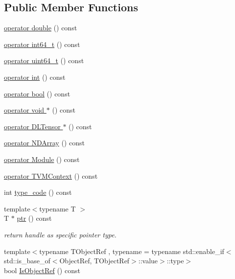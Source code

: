 \subsection*{Public Member Functions}
\begin{DoxyCompactItemize}
\item 
\hyperlink{classtvm_1_1runtime_1_1TVMPODValue___a5ce868719163d4131526a51ae50ee58d}{operator double} () const 
\item 
\hyperlink{classtvm_1_1runtime_1_1TVMPODValue___ac165086c9b9eb10ec15843681beedb3b}{operator int64\+\_\+t} () const 
\item 
\hyperlink{classtvm_1_1runtime_1_1TVMPODValue___abee98b24b41c9cfd0731ba5c5f5846a3}{operator uint64\+\_\+t} () const 
\item 
\hyperlink{classtvm_1_1runtime_1_1TVMPODValue___a50fddd03f30c0feb612cdb9eb2e2ad70}{operator int} () const 
\item 
\hyperlink{classtvm_1_1runtime_1_1TVMPODValue___a6d3e2520d7329a8ef0d4ada22ece5fa8}{operator bool} () const 
\item 
\hyperlink{classtvm_1_1runtime_1_1TVMPODValue___a2b823e57fb67bba8c052d7c2f8892253}{operator void $\ast$} () const 
\item 
\hyperlink{classtvm_1_1runtime_1_1TVMPODValue___ad4ac7900cf899e31f5834c8ac3a2d6d1}{operator D\+L\+Tensor $\ast$} () const 
\item 
\hyperlink{classtvm_1_1runtime_1_1TVMPODValue___a2b949a0699c7d58ea7cd8eda6c3e1bcf}{operator N\+D\+Array} () const 
\item 
\hyperlink{classtvm_1_1runtime_1_1TVMPODValue___a6a2d985b2e4573dcb2f518299c08b365}{operator Module} () const 
\item 
\hyperlink{classtvm_1_1runtime_1_1TVMPODValue___a4fc0e1332d57c439e8bf8c05aff15fbc}{operator T\+V\+M\+Context} () const 
\item 
int \hyperlink{classtvm_1_1runtime_1_1TVMPODValue___a5a799e4197f227549cd641b0e753f9b8}{type\+\_\+code} () const 
\item 
{\footnotesize template$<$typename T $>$ }\\T $\ast$ \hyperlink{classtvm_1_1runtime_1_1TVMPODValue___a362662e4d4b67c031ff70d4397052b29}{ptr} () const 
\begin{DoxyCompactList}\small\item\em return handle as specific pointer type. \end{DoxyCompactList}\item 
{\footnotesize template$<$typename T\+Object\+Ref , typename  = typename std\+::enable\+\_\+if$<$             std\+::is\+\_\+base\+\_\+of$<$\+Object\+Ref, T\+Object\+Ref$>$\+::value$>$\+::type$>$ }\\bool \hyperlink{classtvm_1_1runtime_1_1TVMPODValue___a35455daf8c507edabf726c30de60fbed}{Is\+Object\+Ref} () const 

\end{DoxyCompactItemize}
